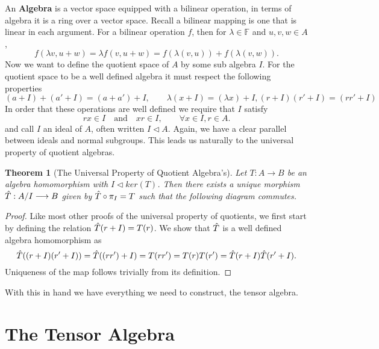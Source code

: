 \documentclass[12pt]{extarticle}
\newtheorem*{theorem}{Theorem}
\renewcommand{\to}[0]{\longrightarrow}
\newcommand{\writeand}[0]{{\quad \textrm{and} \quad}}
\newcommand{\F}{{\mathbb{F}}}
\begin{document}
An \textbf{Algebra} is a vector space equipped with a bilinear operation, in terms of algebra it is a ring over a vector space. Recall a bilinear mapping is one that is linear in each argument. For a bilinear operation $f$, then for $\lambda \in \F$ and $u, v, w \in A$,
\[
  f(\lambda v, u + w) = \lambda f(v, u + w)  = f(\lambda(v,u)) + f(\lambda (v,w)).
\]
Now we want to define the quotient space of $A$ by some sub algebra $I$. For the quotient space to be a well defined algebra it must respect the following properties 
\[
  (a + I) + (a' + I) = (a + a') + I, \qquad \lambda(x + I) = (\lambda x) +I , (r + I)(r' + I) = (rr' + I)
\]
In order that these operations are well defined we require that $I$ satisfy 
\[
    rx \in I \writeand xr \in I, \qquad \forall x \in I, r \in A.
\]
and call $I$ an ideal of $A$, often written $I \lhd A$. Again, we have a clear parallel between ideals and normal subgroups. This leads us naturally to the universal property of quotient algebras.

\begin{theorem}[The Universal Property of Quotient Algebra's]
    Let $T : A \to B$ be an algebra homomorphism with $I \lhd ker(T)$. Then there exists a unique morphism $\Hat{T} : A/I \to B$ given by $\Hat{T} \circ \pi_I  = T$ such that the following diagram commutes. 
    
  \begin{center}
  \end{center}
\end{theorem}
\begin{proof}
  Like most other proofs of the universal property of quotients, we first start by defining the relation $\Hat{T}(r + I) = T(r)$. We show that $\Hat{T}$ is a well defined algebra homomorphism as 
  \[
    \Hat{T}((r + I)(r' + I)) = \Hat{T}((rr') + I) = T(rr') = T(r)T(r') = \Hat{T}(r + I)\Hat{T}(r' + I).
  \] 
  Uniqueness of the map follows trivially from its definition.
\end{proof}

With this in hand we have everything we need to construct, the tensor algebra.

\section*{The Tensor Algebra}
\end{document}
